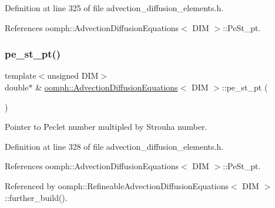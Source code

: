 Definition at line 325 of file advection\+\_\+diffusion\+\_\+elements.\+h.



References oomph\+::\+Advection\+Diffusion\+Equations$<$ D\+I\+M $>$\+::\+Pe\+St\+\_\+pt.

\mbox{\label{classoomph_1_1AdvectionDiffusionEquations_aab0fe6d25a1506aea517e359e0e5e807}} 
\subsubsection{\texorpdfstring{pe\+\_\+st\+\_\+pt()}{pe\_st\_pt()}}
{\footnotesize\ttfamily template$<$unsigned D\+IM$>$ \\
double$\ast$ \& \hyperlink{classoomph_1_1AdvectionDiffusionEquations}{oomph\+::\+Advection\+Diffusion\+Equations}$<$ D\+IM $>$\+::pe\+\_\+st\+\_\+pt (\begin{DoxyParamCaption}{ }\end{DoxyParamCaption})\hspace{0.3cm}{\ttfamily [inline]}}



Pointer to Peclet number multipled by Strouha number. 



Definition at line 328 of file advection\+\_\+diffusion\+\_\+elements.\+h.



References oomph\+::\+Advection\+Diffusion\+Equations$<$ D\+I\+M $>$\+::\+Pe\+St\+\_\+pt.



Referenced by oomph\+::\+Refineable\+Advection\+Diffusion\+Equations$<$ D\+I\+M $>$\+::further\+\_\+build().

\mbox{\label{classoomph_1_1AdvectionDiffusionEquations_a37c30bb64389d12ffef51f046d846886}} 
